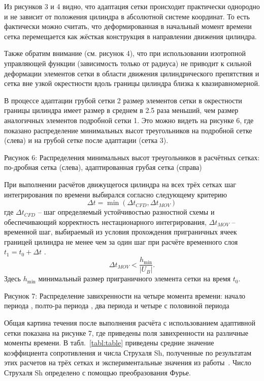 Из рисунков 3 и 4 видно, что адаптация сетки происходит практически однородно и не зависит от положения цилиндра в абсолютной системе координат. То есть фактически можно считать, что деформированная в начальный момент времени сетка перемещается как жёсткая конструкция в направлении движения цилиндра.

Также обратим внимание (см. рисунок 4), что при использовании изотропной управляющей функции (зависимость только от радиуса) не приводит к сильной деформации элементов сетки в области движения цилиндрического препятствия и сетка вне узкой окрестности вдоль границы цилиндра близка к квазиравномерной.

В процессе адаптации грубой сетки 2 размер элементов сетки в окрестности границы цилиндра имеет размер в среднем в 2.5 раза меньший, чем размер аналогичных элементов подробной сетки 1. Это можно видеть на рисунке 6, где показано распределение минимальных высот треугольников на подробной сетке (слева) и на грубой сетке после адаптации (сетка 3). 


Рисунок 6: 	Распределения минимальных высот треугольников в расчётных сетках: по-дробная сетка (слева), адаптированная грубая сетка (справа)

При выполнении расчётов движущегося цилиндра на всех трёх сетках шаг интегрирования по времени выбирался согласно следующему критерию
\begin{equation}\label{eq:time_step}
\Delta t  =\min(\Delta t_{CFD}, \Delta t_{MOV})
\end{equation}
где   $\Delta t_{CFD}$ – шаг определяемый устойчивостью разностной схемы и обеспечивающий корректность нестационарного интегрирования,   $\Delta t_{MOV}$ – временной шаг, выбираемый из условия прохождения приграничных ячеек границей цилиндра не менее чем за один шаг при расчёте временного слоя  $t_1 = t_0+\Delta t$ 
.\begin{equation}\label{eq:time_step_mov}
\Delta t_{MOV} < \frac{h_{\mathrm{min}}}{|U_B|}.
\end{equation}
Здесь  $h_{\mathrm{min}}$ минимальный размер приграничного элемента сетки на время  $t_0$.



Рисунок 7: 	Распределение завихренности на четыре момента времени: начало периода  , полто-ра периода  , два периода  и четыре с половиной периода  


Общая картина течения после выполнения расчёта с использованием адаптивной сетки показана на рисунке 7, где приведены поля завихренности на различные моменты времени. В табл.~\ref{tabl:table} приведены средние значение коэффициента сопротивления  и числа Струхаля Sh, полученные по результатам этих расчетов на трёх сетках и экспериментальные значения из работы~\cite{henderson1997nonlinear}. Число Струхаля  Sh определено с помощью преобразования Фурье.


